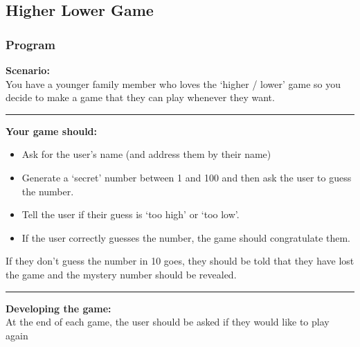 \documentclass[a4paper,12pt]{article}
\begin{document}
\newpage
\subsection{Higher Lower Game}
\subsubsection{Program}

\textbf{Scenario:}\\
You have a younger family member who loves the ‘higher / lower’ game so you decide to make a game that they can play whenever they want.\\
\hrule\vspace{0.5cm}
\textbf{Your game should:}
\begin{itemize}
	\item Ask for the user’s name (and address them by their name)
	\item Generate a ‘secret’ number between 1 and 100 and then ask the user to guess the number.
	\item Tell the user if their guess is ‘too high’ or ‘too low’.
	\item If the user correctly guesses the number, the game should congratulate them.
\end{itemize}
If they don’t guess the number in 10 goes, they should be told that they have lost the game and the mystery number should be revealed.\\
\hrule\vspace{0.5cm}
\textbf{Developing the game:}\\
At the end of each game, the user should be asked if they would like to play again
\end{document}
